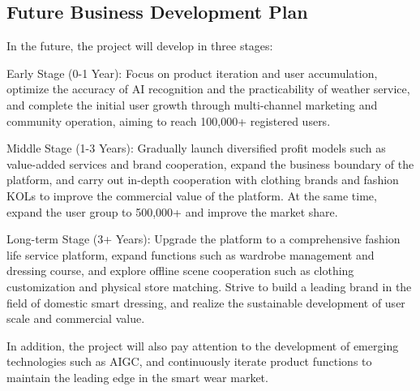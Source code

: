 \documentclass[12pt,a4paper]{article}
\begin{document}
\subsection{Future Business Development Plan}
In the future, the project will develop in three stages:

Early Stage (0-1 Year): Focus on product iteration and user accumulation, optimize the accuracy of AI recognition and the practicability of weather service, and complete the initial user growth through multi-channel marketing and community operation, aiming to reach 100,000+ registered users.

Middle Stage (1-3 Years): Gradually launch diversified profit models such as value-added services and brand cooperation, expand the business boundary of the platform, and carry out in-depth cooperation with clothing brands and fashion KOLs to improve the commercial value of the platform. At the same time, expand the user group to 500,000+ and improve the market share.

Long-term Stage (3+ Years): Upgrade the platform to a comprehensive fashion life service platform, expand functions such as wardrobe management and dressing course, and explore offline scene cooperation such as clothing customization and physical store matching. Strive to build a leading brand in the field of domestic smart dressing, and realize the sustainable development of user scale and commercial value.

In addition, the project will also pay attention to the development of emerging technologies such as AIGC, and continuously iterate product functions to maintain the leading edge in the smart wear market.
\end{document}
